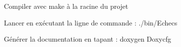 Compiler avec make à la racine du projet

Lancer en exécutant la ligne de commande \-: ./bin/\-Echecs

Générer la documentation en tapant \-: doxygen Doxycfg 